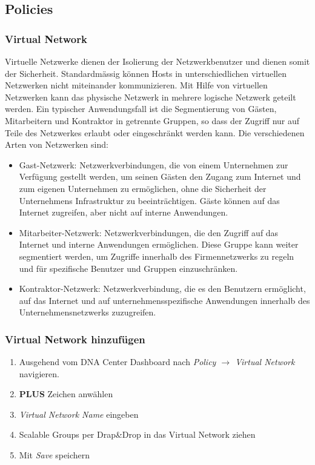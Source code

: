 \subsection{Policies}

\subsubsection{Virtual Network}
Virtuelle Netzwerke dienen der Isolierung der Netzwerkbenutzer und dienen somit der Sicherheit. Standardmässig können Hosts in unterschiedlichen virtuellen Netzwerken nicht miteinander kommunizieren. Mit Hilfe von virtuellen Netzwerken kann das physische Netzwerk in mehrere logische Netzwerk geteilt werden. Ein typischer Anwendungsfall ist die Segmentierung von Gästen, Mitarbeitern und Kontraktor in getrennte Gruppen, so dass der Zugriff nur auf Teile des Netzwerkes erlaubt oder eingeschränkt werden kann. Die verschiedenen Arten von Netzwerken sind:

\begin{itemize}
	\item Gast-Netzwerk: Netzwerkverbindungen, die von einem Unternehmen zur Verfügung gestellt werden, um seinen Gästen den Zugang zum Internet und zum eigenen Unternehmen zu ermöglichen, ohne die Sicherheit der Unternehmens Infrastruktur zu beeinträchtigen. Gäste können auf das Internet zugreifen, aber nicht auf interne Anwendungen.
	\item Mitarbeiter-Netzwerk: Netzwerkverbindungen, die den Zugriff auf das Internet und interne Anwendungen ermöglichen. Diese Gruppe kann weiter segmentiert werden, um Zugriffe innerhalb des Firmennetzwerks zu regeln und für spezifische Benutzer und Gruppen einzuschränken.
	\item Kontraktor-Netzwerk: Netzwerkverbindung, die es den Benutzern ermöglicht, auf das Internet und auf unternehmensspezifische Anwendungen innerhalb des Unternehmensnetzwerks zuzugreifen. 
\end{itemize}

\subsubsection{Virtual Network hinzufügen}
\begin{enumerate}
	\item Ausgehend vom DNA Center Dashboard nach \textit{Policy $\rightarrow$ Virtual Network} navigieren.
	\item \textbf{PLUS} Zeichen anwählen
	\item \textit{Virtual Network Name} eingeben
	\item Scalable Groups per Drap\&Drop in das Virtual Network ziehen
	\item Mit \textit{Save} speichern
\end{enumerate}

